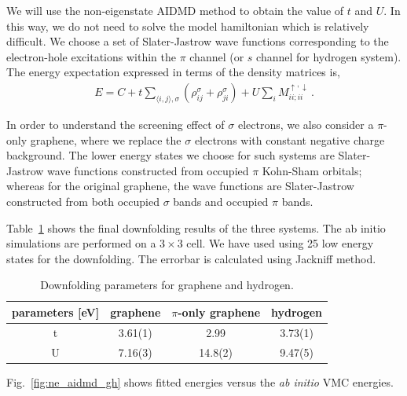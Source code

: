 \documentclass[prl,12pt,onecolumn,nofootinbib,notitlepage,english,superscriptaddress]{revtex4-1}
\begin{document}
We will use the non-eigenstate AIDMD method to obtain the value of $t$ and $U$. In this way, we do not need to solve the model hamiltonian which is relatively difficult. We choose a set of Slater-Jastrow wave functions corresponding to the electron-hole excitations within the $\pi$ channel (or $s$ channel for hydrogen system). The energy expectation expressed in terms of the density matrices is, 
\begin{eqnarray}\label{eq:en}
E = C + t\sum_{\langle i, j\rangle, \sigma}( \rho_{ij}^\sigma + \rho_{ji}^\sigma) + U \sum_{i}M_{ii;ii}^{\uparrow,\downarrow}\,.
\end{eqnarray}

In order to understand the screening effect of $\sigma$ electrons, we also consider a $\pi$-only graphene, where we replace the $\sigma$ electrons with constant negative charge background. The lower energy states we choose for such systems are Slater-Jastrow wave functions constructed from occupied $\pi$ Kohn-Sham orbitals; whereas for the original graphene, the wave functions are Slater-Jastrow constructed from both occupied $\sigma$ bands and occupied $\pi$ bands. 

Table~\ref{tab:grpheffm} shows the final downfolding results of the three systems. The ab initio simulations are performed on a $3\times3$ cell. We have used using 25 low energy states for the downfolding. The errorbar is calculated using Jackniff method. 
\begin{table}[ht]\caption{Downfolding parameters for graphene and hydrogen.}\label{tab:grpheffm}
\centering
\begin{tabular}{|c|c|c|c|}
\hline
parameters [eV] & graphene & $\pi$-only graphene &hydrogen \\
\hline
\hline
t & 3.61(1) & 2.99 & 3.73(1)\\
U & 7.16(3) & 14.8(2) & 9.47(5)\\
\hline
\end{tabular}
\end{table} 
Fig.~\ref{fig:ne_aidmd_gh} shows fitted energies versus the \textit{ab initio} VMC energies. 
\end{document}
